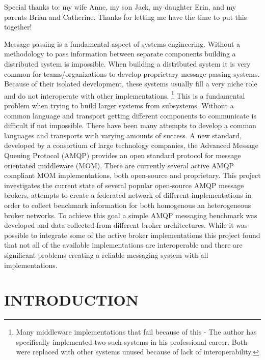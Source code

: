 \documentclass{thesis}
\author{David Joe Wade}
\begin{document}
 
\listoftodos
\titlepage            	 %
\tableofcontents          %
\listoftables          	 %
\listoffigures         	 %

Special thanks to: my wife Anne, my son Jack, my daughter Erin, and my parents Brian and Catherine.  Thanks for letting me have the time to put this together!  

Message passing is a fundamental aspect of systems engineering.  Without a methodology to pass information between separate components building a distributed system is impossible.  When building a distributed system it is very common for teams/organizations to develop proprietary message passing systems.  Because of their isolated development, these systems usually fill a very niche role and do not interoperate with other implementations. \footnote{Many middleware implementations that fail because of this - The author has specifically implemented two such systems in his professional career.  Both were replaced with other systems unused because of lack of interoperability.} This is a fundamental problem when trying to build larger systems from subsystems.  Without a common language and transport getting different components to communicate is difficult if not impossible.  There have been many attempts to develop a common languages and transports with varying amounts of success.  A new standard, developed by a consortium of large technology companies, the Advanced Message Queuing Protocol (AMQP) provides an open standard protocol for message orientated middleware (MOM).  There are currently several active AMQP compliant MOM implementations, both open-source and proprietary.  This project investigates the current state of several popular open-source AMQP message brokers, attempts to create a federated network of different implementations in order to collect benchmark information for both homogenous an heterogeneous broker networks.  To achieve this goal a simple AMQP messaging benchmark was developed and data collected from different broker architectures.  While it was possible to integrate some of the active broker implementations this project found that not all of the available implementations are interoperable and there are significant problems creating a reliable messaging system with all implementations.  

\chapter{INTRODUCTION}
\end{document}
